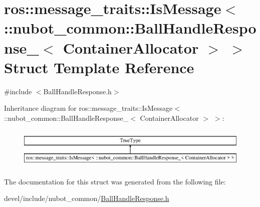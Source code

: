 \hypertarget{structros_1_1message__traits_1_1IsMessage_3_01_1_1nubot__common_1_1BallHandleResponse___3_01ContainerAllocator_01_4_01_4}{\section{ros\-:\-:message\-\_\-traits\-:\-:Is\-Message$<$ \-:\-:nubot\-\_\-common\-:\-:Ball\-Handle\-Response\-\_\-$<$ Container\-Allocator $>$ $>$ Struct Template Reference}
\label{structros_1_1message__traits_1_1IsMessage_3_01_1_1nubot__common_1_1BallHandleResponse___3_01ContainerAllocator_01_4_01_4}
}


{\ttfamily \#include $<$Ball\-Handle\-Response.\-h$>$}

Inheritance diagram for ros\-:\-:message\-\_\-traits\-:\-:Is\-Message$<$ \-:\-:nubot\-\_\-common\-:\-:Ball\-Handle\-Response\-\_\-$<$ Container\-Allocator $>$ $>$\-:\begin{figure}[H]
\begin{center}
\leavevmode
\includegraphics[height=1.978799cm]{structros_1_1message__traits_1_1IsMessage_3_01_1_1nubot__common_1_1BallHandleResponse___3_01ContainerAllocator_01_4_01_4}
\end{center}
\end{figure}


The documentation for this struct was generated from the following file\-:\begin{DoxyCompactItemize}
\item 
devel/include/nubot\-\_\-common/\hyperlink{BallHandleResponse_8h}{Ball\-Handle\-Response.\-h}\end{DoxyCompactItemize}
